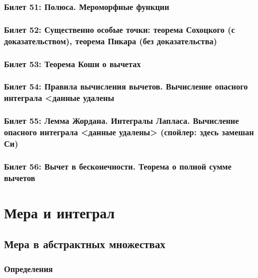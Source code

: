 \documentclass[12pt, a4paper, oneside]{memoir}
\begin{document}
\subsection{Билет 51: Полюса. Мероморфные функции}

\subsection{Билет 52: Существенно особые точки: теорема Сохоцкого (с доказательством), теорема Пикара (без доказательства)}

\subsection{Билет 53: Теорема Коши о вычетах}

\subsection{Билет 54: Правила вычисления вычетов. Вычисление опасного интеграла <данные удалены}

\subsection{Билет 55: Лемма Жордана. Интегралы Лапласа. Вычисление опасного интеграла <данные удалены> (спойлер: здесь замешан Си)}

\subsection{Билет 56: Вычет в бесконечности. Теорема о полной сумме вычетов}






\chapter{Мера и интеграл}


\section{Мера в абстрактных множествах}

\subsection{Определения}
\end{document}
